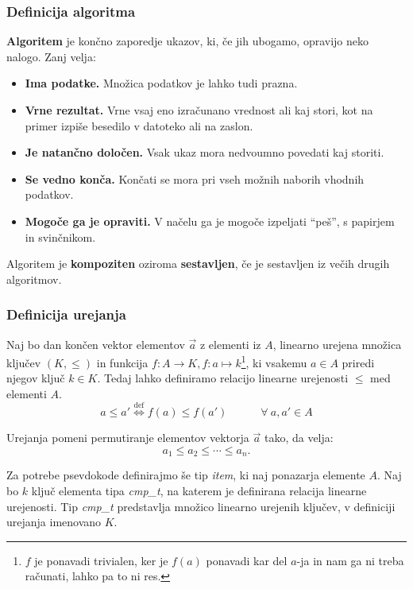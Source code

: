 \documentclass[a4paper,oneside,12pt]{article}
\begin{document}
\subsubsection{Definicija algoritma}

\begin{definicija}
\textbf{Algoritem} je končno zaporedje ukazov, ki, če jih ubogamo, opravijo neko nalogo.
Zanj velja:
\begin{itemize}
  \item \textbf{Ima podatke.} Množica podatkov je lahko tudi prazna.
  \item \textbf{Vrne rezultat.} Vrne vsaj eno izračunano vrednost ali kaj stori, kot na primer
    izpiše besedilo v datoteko ali na zaslon.
  \item \textbf{Je natančno določen.} Vsak ukaz mora nedvoumno povedati kaj storiti.
  \item \textbf{Se vedno konča.} Končati se mora pri vseh možnih naborih vhodnih podatkov.
  \item \textbf{Mogoče ga je opraviti.} V načelu ga je mogoče izpeljati ``peš'', s papirjem in
    svinčnikom.
\end{itemize}
\end{definicija}

\begin{definicija}
  Algoritem je \textbf{kompoziten} oziroma \textbf{sestavljen}, če je sestavljen iz večih
  drugih algoritmov.
\end{definicija}

\subsubsection{Definicija urejanja}
\label{chapter:sortdef}
Naj bo dan končen vektor elementov $\vec{a}$ z elementi iz $A$, linearno urejena množica ključev $(K,
\leq)$ in funkcija $f\!\!: A \rightarrow K, f\!\!: a \mapsto k$\footnote{
$f$ je ponavadi trivialen, ker je $f(a)$ ponavadi kar del
$a$-ja in nam ga ni treba računati, lahko pa to ni res.}, ki vsakemu $a \in A$ priredi
njegov ključ $k \in K$.
Tedaj lahko definiramo relacijo linearne urejenosti $\leq$ med elementi $A$.
\[ a \leq a' \overset{\text{def}}{\Longleftrightarrow} f(a) \leq f(a') \hspace{3em} \forall\ a, a' \in A \]


Urejanja pomeni permutiranje elementov vektorja $\vec{a}$ tako, da velja:
\[ a_1 \leq a_2 \leq \cdots \leq a_n.\]

Za potrebe psevdokode definirajmo še tip \emph{item}, ki naj ponazarja elemente $A$.
Naj bo $k$ ključ elementa tipa \emph{cmp\_\!t}, na katerem je definirana relacija
linearne urejenosti. Tip \emph{cmp\_\!t} predstavlja množico linearno urejenih ključev,
v definiciji urejanja imenovano $K$.
\end{document}
